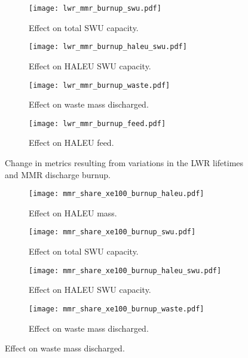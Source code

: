 \begin{figure}
    \ContinuedFloat    
    \begin{subfigure}[t]{0.48\textwidth}
        \centering
        \texttt{[image: lwr\_mmr\_burnup\_swu.pdf]}
        \caption{Effect on total SWU capacity.}
        \label{fig:lwr_mmr_burnup_swu}
    \end{subfigure}
    \hfill
    \begin{subfigure}[t]{0.48\textwidth}
        \centering
        \texttt{[image: lwr\_mmr\_burnup\_haleu\_swu.pdf]}
        \caption{Effect on HALEU SWU capacity.}
        \label{fig:lwr_mmr_burnup_haleu_swu}
    \end{subfigure}
    
    \begin{subfigure}[t]{0.48\textwidth}
        \centering
        \texttt{[image: lwr\_mmr\_burnup\_waste.pdf]}
        \caption{Effect on waste mass discharged.}
        \label{fig:lwr_mmr_burnup_waste}
    \end{subfigure}
    \hfill
    \begin{subfigure}[t]{0.48\textwidth}
        \centering
        \texttt{[image: lwr\_mmr\_burnup\_feed.pdf]}
        \caption{Effect on HALEU feed.}
        \label{fig:lwr_mmr_burnup_feed}
    \end{subfigure}
    \caption{Change in metrics resulting from variations in the 
    LWR lifetimes and MMR discharge burnup.}
    \label{fig:lwr_mmr_burnup}
\end{figure}

\begin{figure}
    \begin{subfigure}[t]{0.48\textwidth}
        \centering
        \texttt{[image: mmr\_share\_xe100\_burnup\_haleu.pdf]}
        \caption{Effect on HALEU mass.}
        \label{fig:mmr_share_xe100_burnup_haleu}
    \end{subfigure}
    \hfill 
    \begin{subfigure}[t]{0.48\textwidth}
        \centering
        \texttt{[image: mmr\_share\_xe100\_burnup\_swu.pdf]}
        \caption{Effect on total SWU capacity.}
        \label{fig:mmr_share_xe100_burnup_swu}
    \end{subfigure}
    \hfill
    \begin{subfigure}[t]{0.48\textwidth}
        \centering
        \texttt{[image: mmr\_share\_xe100\_burnup\_haleu\_swu.pdf]}
        \caption{Effect on HALEU SWU capacity.}
        \label{fig:mmr_share_xe100_burnup_haleu_swu}
    \end{subfigure}
    \hfill
    \begin{subfigure}[t]{0.48\textwidth}
        \centering
        \texttt{[image: mmr\_share\_xe100\_burnup\_waste.pdf]}
        \caption{Effect on waste mass discharged.}
        \label{fig:mmr_share_xe100_burnup_waste}
    \end{subfigure}
\end{figure}

